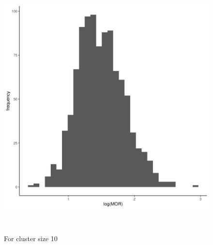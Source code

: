 \documentclass[
  letterpaper,
  DIV=11,
  numbers=noendperiod,
  titlepage]{scrartcl}
\begin{document}
\begin{figure}
\begin{minipage}[t]{0.50\linewidth}
{{\includegraphics{../../plots/two-lvl-ran-int/high-prev/hist_30_10_two_lvl_high_prev.png}

}

\caption{For cluster size 10}

}

\end{minipage}%
\newline
\begin{minipage}[t]{\linewidth}

{\centering 

~

}

\end{minipage}%
\newline
\begin{minipage}[t]{0.50\linewidth}

{\centering 

\raisebox{-\height}{

}}
\end{minipage}
\end{figure}
\end{document}
